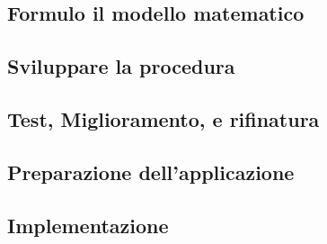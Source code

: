 \documentclass{article}
\begin{document}
    \subsection{Formulo il modello matematico}

    \subsection{Sviluppare la procedura}

    \subsection{Test, Miglioramento, e rifinatura}

    \subsection{Preparazione dell'applicazione}

    \subsection{Implementazione}
\end{document}
